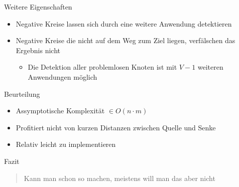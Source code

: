 \begin{frame}{Weitere Eigenschaften}

\begin{itemize}
\itemsep1pt\parskip0pt
\item
  Negative Kreise lassen sich durch eine weitere Anwendung detektieren
\item
  Negative Kreise die nicht auf dem Weg zum Ziel liegen, verfälschen das
  Ergebnis nicht

  \begin{itemize}
  \itemsep1pt\parskip0pt
  \item
    Die Detektion aller problemlosen Knoten ist mit $V - 1$ weiteren
    Anwendungen möglich
  \end{itemize}
\end{itemize}

\end{frame}

\begin{frame}{Beurteilung}

\begin{itemize}
\itemsep1pt\parskip0pt
\item
  Assymptotische Komplexität $\in O(n \cdot m)$
\item
  Profitiert nicht von kurzen Distanzen zwischen Quelle und Senke
\item
  Relativ leicht zu implementieren
\end{itemize}

\end{frame}

\begin{frame}{Fazit}

\begin{quote}
Kann man schon so machen, meistens will man das aber nicht
\end{quote}

\end{frame}
